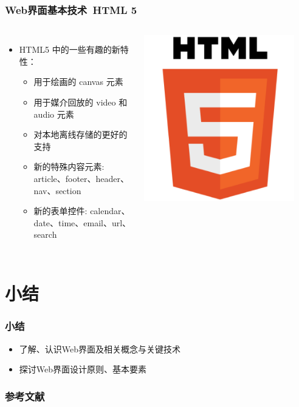 \documentclass{beamer}
\begin{document}
\begin{frame}
	\frametitle{Web界面基本技术~{\small HTML 5}}
	\beamertemplatetransparentcovereddynamicmedium
	\begin{columns}
	\begin{itemize}[<+->]
		\item HTML5 中的一些有趣的新特性：
		\begin{itemize}
			\item {\tiny 用于绘画的 canvas 元素}
			\item {\tiny 用于媒介回放的 video 和 audio 元素}
			\item {\tiny 对本地离线存储的更好的支持}
			\item {\tiny 新的特殊内容元素: article、footer、header、nav、section}
			\item {\tiny 新的表单控件: calendar、date、time、email、url、search}
		\end{itemize}
	\end{itemize}
	\includegraphics[width=0.9\textwidth]{images/html-5.png}
	\end{columns}
\end{frame}

\section{小结}
\begin{frame}
	\frametitle{小结}
	\begin{itemize}
		\item 了解、认识Web界面及相关概念与关键技术
		\item 探讨Web界面设计原则、基本要素
	\end{itemize}
\end{frame}

\begin{frame}
	\frametitle{参考文献}
	
	
\end{frame}
\end{document}
